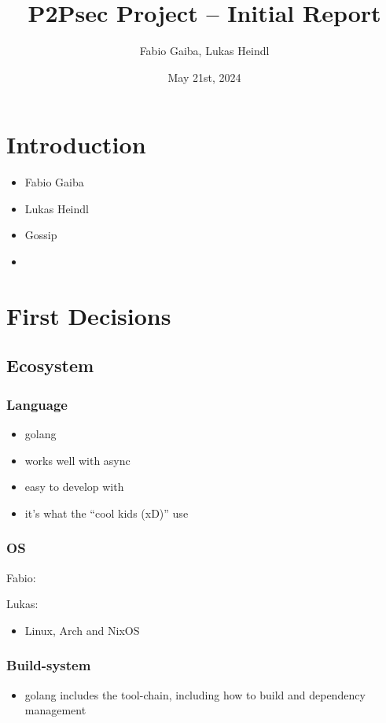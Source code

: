 \documentclass[a4paper,english,10pt,NET]{tumarticle}
\title{P2Psec Project -- Initial Report}
\author{Fabio Gaiba, Lukas Heindl}
\date{May 21st, 2024}
\begin{document}
\maketitle
{}
\thispagestyle{tumarticle}

\section{Introduction}
\begin{itemize}
	\item Fabio Gaiba
	\item Lukas Heindl
	\item Gossip
	\item {}
\end{itemize}

\section{First Decisions}
\subsection{Ecosystem}
\subsubsection{Language}
\begin{itemize}
	\item golang
	\item works well with async
	\item easy to develop with
	\item it's what the \enquote{cool kids (xD)} use
\end{itemize}

\subsubsection{OS}

Fabio:

Lukas:


\begin{itemize}
	\item Linux, Arch and NixOS
\end{itemize}

\subsubsection{Build-system}
\begin{itemize}
	\item golang includes the tool-chain, including how to build and dependency management
\end{itemize}
\end{document}
